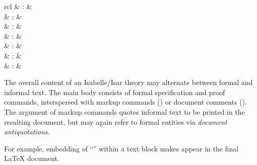 \begin{isabellebody}
\begin{isamarkuptext}
\begin{matharray}{rcl}
    \hypertarget{antiquotation.goals}{\hyperlink{antiquotation.goals}{\mbox{}}} & : &  \\
    \hypertarget{antiquotation.subgoals}{\hyperlink{antiquotation.subgoals}{\mbox{}}} & : &  \\
    \hypertarget{antiquotation.prf}{\hyperlink{antiquotation.prf}{\mbox{}}} & : &  \\
    \hypertarget{antiquotation.full-prf}{\hyperlink{antiquotation.full-prf}{\mbox{}}} & : &  \\
    \hypertarget{antiquotation.ML}{\hyperlink{antiquotation.ML}{\mbox{}}} & : &  \\
    \hypertarget{antiquotation.ML-type}{\hyperlink{antiquotation.ML-type}{\mbox{}}} & : &  \\
    \hypertarget{antiquotation.ML-struct}{\hyperlink{antiquotation.ML-struct}{\mbox{}}} & : &  \\
  \end{matharray}

  The overall content of an Isabelle/Isar theory may alternate between
  formal and informal text.  The main body consists of formal
  specification and proof commands, interspersed with markup commands
  () or document comments ().
  The argument of markup commands quotes informal text to be printed
  in the resulting document, but may again refer to formal entities
  via \emph{document antiquotations}.

  For example, embedding of ``''
  within a text block makes
   appear in the final {\LaTeX} document.


\end{isamarkuptext}
\end{isabellebody}
